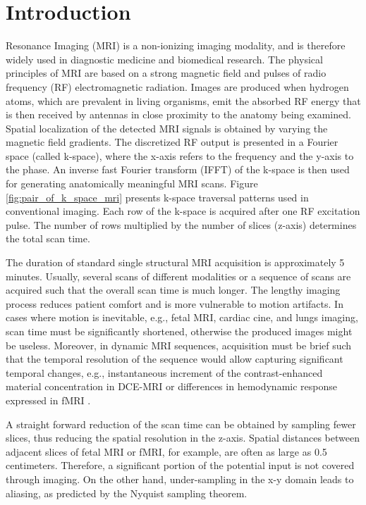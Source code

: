 \documentclass[10pt,journal,compsoc]{IEEEtran}
\begin{document}
\maketitle
\IEEEdisplaynontitleabstractindextext
\IEEEpeerreviewmaketitle


\section{Introduction}
 Resonance Imaging (MRI) is a non-ionizing imaging modality, and is therefore widely used in diagnostic medicine and biomedical research. The physical principles of MRI are based on a strong magnetic field and pulses of radio frequency (RF) electromagnetic radiation. 
Images are produced when hydrogen atoms, which are prevalent in living organisms, emit the absorbed RF energy that is then received by antennas in close proximity to the anatomy being examined. Spatial localization of the detected MRI signals is obtained by varying the magnetic field gradients. The discretized RF output is presented in a Fourier space
(called k-space), where the x-axis refers to the frequency and the y-axis to the phase. An inverse fast Fourier transform (IFFT) of the k-space is then used for generating anatomically meaningful MRI scans. Figure \ref{fig:pair_of_k_space_mri} presents k-space traversal patterns used in conventional imaging. Each row of the k-space is acquired after one RF excitation pulse. The number of rows multiplied by the number of slices (z-axis) determines the total scan time.

The duration of standard single structural MRI acquisition is approximately 5 minutes. Usually, several scans of different modalities or a sequence of scans are acquired such that the overall scan time is much longer. The lengthy imaging process reduces patient comfort and is more vulnerable to motion artifacts. In cases where motion is inevitable, e.g., fetal MRI, cardiac cine, and lungs imaging, scan time must be significantly shortened, otherwise the produced images might be useless. Moreover, in dynamic MRI sequences, acquisition must be brief such that the temporal resolution of the sequence would allow capturing significant temporal changes, e.g., instantaneous increment of the contrast-enhanced material concentration in DCE-MRI or differences in hemodynamic response expressed in fMRI \cite{moeller2010multiband}.

A straight forward reduction of the scan time can be obtained by sampling fewer slices, thus reducing the spatial resolution in the z-axis. Spatial distances between adjacent slices of fetal MRI or fMRI, for example, are often as large as 0.5 centimeters. Therefore, a significant portion of the potential input is not covered through imaging. On the other hand, under-sampling in the x-y domain leads to aliasing, as predicted by the Nyquist sampling theorem.
\end{document}
